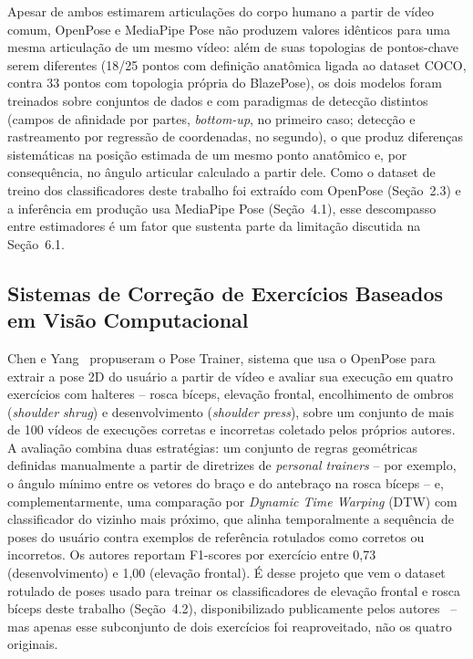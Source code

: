 \documentclass[12pt]{article}
\begin{document}
Apesar de ambos estimarem articulações do corpo humano a partir de vídeo
comum, OpenPose e MediaPipe Pose não produzem valores idênticos para uma
mesma articulação de um mesmo vídeo: além de suas topologias de pontos-chave
serem diferentes (18/25 pontos com definição anatômica ligada ao dataset
COCO, contra 33 pontos com topologia própria do BlazePose), os dois modelos
foram treinados sobre conjuntos de dados e com paradigmas de detecção
distintos (campos de afinidade por partes, \textit{bottom-up}, no primeiro
caso; detecção e rastreamento por regressão de coordenadas, no segundo), o
que produz diferenças sistemáticas na posição estimada de um mesmo ponto
anatômico e, por consequência, no ângulo articular calculado a partir dele.
Como o dataset de treino dos classificadores deste trabalho foi extraído com
OpenPose (Seção~2.3) e a inferência em produção usa MediaPipe Pose
(Seção~4.1), esse descompasso entre estimadores é um fator que sustenta
parte da limitação discutida na Seção~6.1.

\subsection{Sistemas de Correção de Exercícios Baseados em Visão Computacional}

Chen e Yang~\cite{chen2020poseexercise} propuseram o Pose Trainer, sistema
que usa o OpenPose para extrair a pose 2D do usuário a partir de vídeo e
avaliar sua execução em quatro exercícios com halteres -- rosca bíceps,
elevação frontal, encolhimento de ombros (\textit{shoulder shrug}) e
desenvolvimento (\textit{shoulder press}), sobre um conjunto de mais de
100 vídeos de execuções corretas e incorretas coletado pelos próprios
autores. A avaliação combina duas estratégias: um conjunto de regras
geométricas definidas manualmente a partir de diretrizes de
\textit{personal trainers} -- por exemplo, o ângulo mínimo entre os vetores
do braço e do antebraço na rosca bíceps -- e, complementarmente, uma
comparação por \textit{Dynamic Time Warping} (DTW) com classificador do
vizinho mais próximo, que alinha temporalmente a sequência de poses do
usuário contra exemplos de referência rotulados como corretos ou incorretos.
Os autores reportam F1-scores por exercício entre 0,73 (desenvolvimento) e
1,00 (elevação frontal). É desse projeto que vem o dataset rotulado de
poses usado para treinar os classificadores de elevação frontal e rosca
bíceps deste trabalho (Seção~4.2), disponibilizado publicamente pelos
autores~\cite{chen2020posetrainerrepo} -- mas apenas esse subconjunto de
dois exercícios foi reaproveitado, não os quatro originais.
\end{document}
